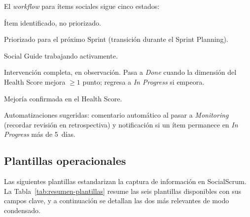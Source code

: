 El \textit{workflow} para ítems sociales sigue cinco estados:

\begin{description}[nosep, leftmargin=1.5cm, style=nextline]
    \item[\textit{Backlog}] Ítem identificado, no priorizado.
    \item[\textit{Ready}] Priorizado para el próximo Sprint (transición durante el Sprint Planning).
    \item[\textit{In Progress}] Social Guide trabajando activamente.
    \item[\textit{Monitoring}] Intervención completa, en observación. Pasa a \textit{Done} cuando la dimensión del Health Score mejora $\geq 1$ punto; regresa a \textit{In Progress} si empeora.
    \item[\textit{Done}] Mejoría confirmada en el Health Score.
\end{description}

\noindent Automatizaciones sugeridas: comentario automático al pasar a \textit{Monitoring} (recordar revisión en retrospectiva) y notificación si un ítem permanece en \textit{In Progress} más de 5~días.

\subsection{Plantillas operacionales}

Las siguientes plantillas estandarizan la captura de información en SocialScrum. La Tabla~\ref{tab:resumen-plantillas} resume las seis plantillas disponibles con sus campos clave, y a continuación se detallan las dos más relevantes de modo condensado.

\begingroup
\scriptsize
\renewcommand{\arraystretch}{1.3}
\setlength{\tabcolsep}{4pt}
\setlength{\LTleft}{0pt}
\setlength{\LTright}{0pt}

